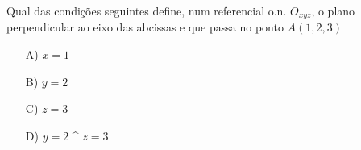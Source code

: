 Qual das condições seguintes define, num referencial o.n. $O_{xyz}$, o plano perpendicular ao eixo das abcissas e que passa no ponto $A(1,2,3)$
\begin{enumerate}
\item [A)] $x=1$
\item [B)] $ y =2$
\item [C)] $ z=3$
\item [D)] $y=2$ ^ $z=3$
\end{enumerate}